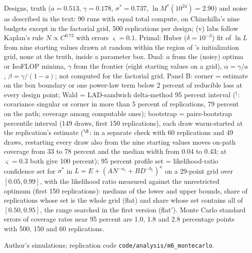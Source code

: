 \begin{table}[tp]
\begin{tablenotes}Designs, truth ($a=0.513$, $\gamma=0.178$, $\sigma^*=0.737$, $\ln M^*(10^{24})=2.90$) and noise as described in the text: 90 runs with equal total compute, on Chinchilla's nine budgets except in the factorial grid, 500 replications per design; (v) labs follow Kaplan's rule $N\propto C^{0.73}$ with errors $\varsigma=0.1$. Primal: Huber ($\delta=10^{-3}$) fit of $\ln L$ from nine starting values drawn at random within the region of \citet{hoffmann2022training}'s initialization grid, none at the truth, inside a parameter box. Dual: $a$ from the (noisy) optima or IsoFLOP minima, $\gamma$ from the frontier (eight starting values on a grid), $\alpha=\gamma/a$, $\beta=\gamma/(1-a)$; not computed for the factorial grid. Panel B: corner = estimate on the box boundary or one power-law term below 2 percent of reducible loss at every design point; Wald = LAD-sandwich delta-method 95 percent interval ($^{\dagger}$: covariance singular or corner in more than 5 percent of replications, 79 percent on the path; coverage among computable ones); bootstrap = pairs-bootstrap percentile interval (149 draws, first 150 replications), each draw warm-started at the replication's estimate ($^{\S}$: in a separate check with 60 replications and 49 draws, restarting every draw also from the nine starting values moves on-path coverage from 33 to 78 percent and the median width from 0.04 to 0.43; at $\varsigma=0.3$ both give 100 percent); 95 percent profile set = likelihood-ratio confidence set for $\sigma^*$ in $L=E+(AN^{-a_1}+BD^{-b_1})^{\kappa}$ on a 29-point grid over $[0.05,0.99]$, with the likelihood ratio measured against the unrestricted optimum (first 150 replications): medians of the lower and upper bounds, share of replications whose set is the whole grid (flat) and share whose set contains all of $[0.50,0.95]$, the range searched in the first version (flat$'$). Monte Carlo standard errors of coverage rates near 95 percent are 1.0, 1.8 and 2.8 percentage points with 500, 150 and 60 replications.\end{tablenotes}
\begin{tablenotes}[Source]Author's simulations; replication code \texttt{code/analysis/m6\_montecarlo}.\end{tablenotes}
\end{table}
